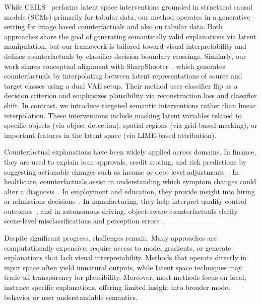 While CEILS~\cite{crupi2021counterfactualexplanationsinterventionslatent} performs latent space interventions grounded in structural causal models (SCMs) primarily for tabular data, our method operates in a generative setting for image based counterfactuals and also on tabular data. Both approaches share the goal of generating semantically valid explanations via latent manipulation, but our framework is tailored toward visual interpretability and defines counterfactuals by classifier decision boundary crossings. Similarly, our work shares conceptual alignment with SharpShooter~\cite{barr2021counterfactualexplanationslatentspace}, which generates counterfactuals by interpolating between latent representations of source and target classes using a dual VAE setup. Their method uses classifier flip as a decision criterion and emphasizes plausibility via reconstruction loss and classifier shift. In contrast, we introduce targeted semantic interventions rather than linear interpolation. These interventions include masking latent variables related to specific objects (via object detection), spatial regions (via grid-based masking), or important features in the latent space (via LIME-based attribution). 

Counterfactual explanations have been widely applied across domains. In finance, they are used to explain loan approvals, credit scoring, and risk predictions by suggesting actionable changes such as income or debt level adjustments~\cite{guidotti2022counterfactual, DELANEY2023103995, Rudin2019}. In healthcare, counterfactuals assist in understanding which symptom changes could alter a diagnosis~\cite{10.1145/3351095.3372855}. In employment and education, they provide insight into hiring or admissions decisions~\cite{conf/sicsa/WijekoonWNMPC21}. In manufacturing, they help interpret quality control outcomes~\cite{icpram24}, and in autonomous driving, object-aware counterfactuals clarify scene-level misclassifications and perception errors~\cite{zemni2023octetobjectawarecounterfactualexplanations}.

Despite significant progress, challenges remain. Many approaches are computationally expensive, require access to model gradients, or generate explanations that lack visual interpretability. Methods that operate directly in input space often yield unnatural outputs, while latent space techniques may trade off transparency for plausibility.  Moreover, most methods focus on local, instance specific explanations, offering limited insight into broader model behavior or user understandable semantics.

